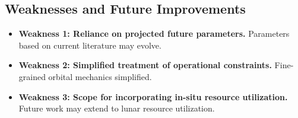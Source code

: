 \documentclass[12pt]{mcmthesis}
\begin{document}
\subsection{Weaknesses and Future Improvements}
\begin{itemize}
    \item \textbf{Weakness 1: Reliance on projected future parameters.}
          Parameters based on current literature may evolve.
    \item \textbf{Weakness 2: Simplified treatment of operational constraints.}
          Fine-grained orbital mechanics simplified.
    \item \textbf{Weakness 3: Scope for incorporating in-situ resource utilization.}
          Future work may extend to lunar resource utilization.
\end{itemize}
\end{document}
